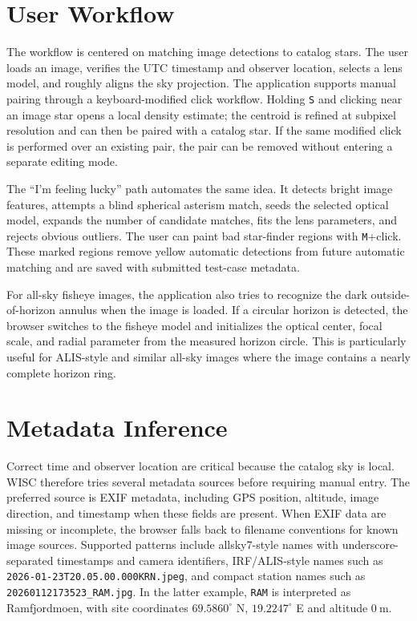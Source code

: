 \documentclass[11pt]{article}
\begin{document}
\section{User Workflow}

The workflow is centered on matching image detections to catalog stars. The user
loads an image, verifies the UTC timestamp and observer location, selects a
lens model, and roughly aligns the sky projection. The application supports
manual pairing through a keyboard-modified click workflow. Holding \texttt{S}
and clicking near an image star opens a local density estimate; the centroid is
refined at subpixel resolution and can then be paired with a catalog star.
If the same modified click is performed over an existing pair, the pair can be
removed without entering a separate editing mode.

The ``I'm feeling lucky'' path automates the same idea. It detects bright image
features, attempts a blind spherical asterism match, seeds the selected optical
model, expands the number of candidate matches, fits the lens parameters, and
rejects obvious outliers. The user can paint bad star-finder regions with
\texttt{M}+click. These marked regions remove yellow automatic detections from
future automatic matching and are saved with submitted test-case metadata.

For all-sky fisheye images, the application also tries to recognize the dark
outside-of-horizon annulus when the image is loaded. If a circular horizon is
detected, the browser switches to the fisheye model and initializes the optical
center, focal scale, and radial parameter from the measured horizon circle.
This is particularly useful for ALIS-style and similar all-sky images where the
image contains a nearly complete horizon ring.

\section{Metadata Inference}

Correct time and observer location are critical because the catalog sky is
local. WISC therefore tries several metadata sources before requiring manual
entry. The preferred source is EXIF metadata, including GPS position, altitude,
image direction, and timestamp when these fields are present. When EXIF data
are missing or incomplete, the browser falls back to filename conventions for
known image sources. Supported patterns include allsky7-style names with
underscore-separated timestamps and camera identifiers, IRF/ALIS-style names
such as \texttt{2026-01-23T20.05.00.000KRN.jpeg}, and compact station names
such as \texttt{20260112173523\_RAM.jpg}. In the latter example, \texttt{RAM}
is interpreted as Ramfjordmoen, with site coordinates \(69.5860^\circ\) N,
\(19.2247^\circ\) E and altitude \(0\ \mathrm{m}\).
\end{document}
